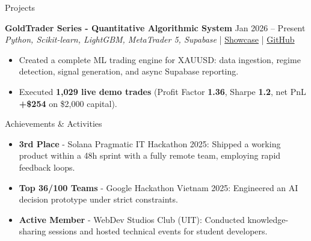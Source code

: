 \documentclass{resume}
\begin{document}
\begin{rSection}{Projects}
    \item \textbf{GoldTrader Series - Quantitative Algorithmic System} \hfill {Jan 2026 -- Present}\\
    {\small \textit{Python, Scikit-learn, LightGBM, MetaTrader 5, Supabase} \hfill | \href{https://goldtrader-showcase.vercel.app}{Showcase} | \href{https://github.com/pckienuit/GoldTrader2}{GitHub}}
    \begin{itemize}
        \itemsep -5pt {}
        \item Created a complete ML trading engine for XAUUSD: data ingestion, regime detection, signal generation, and async Supabase reporting.
        \item Executed \textbf{1,029 live demo trades} (Profit Factor \textbf{1.36}, Sharpe \textbf{1.2}, net PnL \textbf{+\$254} on \$2,000 capital).
    \end{itemize}

\end{rSection}


\begin{rSection}{Achievements \& Activities}
    \vspace{-2pt}
    \begin{itemize}
        \itemsep -5pt {}
        \item \textbf{3rd Place} - Solana Pragmatic IT Hackathon 2025: Shipped a working product within a 48h sprint with a fully remote team, employing rapid feedback loops.
        \item \textbf{Top 36/100 Teams} - Google Hackathon Vietnam 2025: Engineered an AI decision prototype under strict constraints.
        \item \textbf{Active Member} - WebDev Studios Club (UIT): Conducted knowledge-sharing sessions and hosted technical events for student developers.
    \end{itemize}
\end{rSection}
\end{document}
